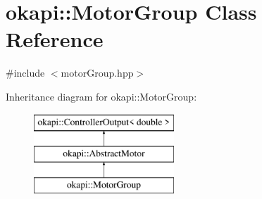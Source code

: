\hypertarget{classokapi_1_1MotorGroup}{}\section{okapi\+::Motor\+Group Class Reference}
\label{classokapi_1_1MotorGroup}


{\ttfamily \#include $<$motor\+Group.\+hpp$>$}

Inheritance diagram for okapi\+::Motor\+Group\+:\begin{figure}[H]
\begin{center}
\leavevmode
\includegraphics[height=3.000000cm]{classokapi_1_1MotorGroup}
\end{center}
\end{figure}
